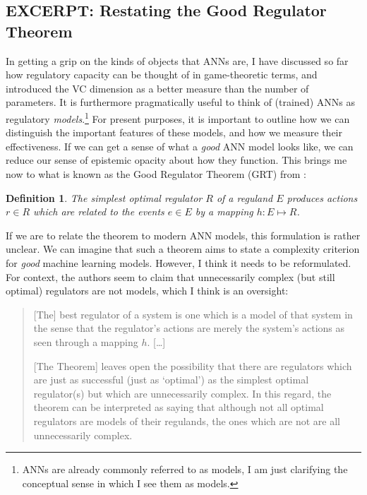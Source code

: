 \documentclass[11pt, oneside]{article}   	%
\newtheorem{theorem}{Definition}
\begin{document}
\subsection{EXCERPT: Restating the Good Regulator Theorem}


In getting a grip on the kinds of objects that ANNs are, I have discussed so far how regulatory capacity can be thought of in game-theoretic terms, and introduced the VC dimension as a better measure than the number of parameters.  It is furthermore pragmatically useful to think of (trained) ANNs as regulatory \emph{models}.\footnote{ANNs are already commonly referred to as models, I am just clarifying the conceptual sense in which I see them as models.}  For present purposes, it is important to outline how we can distinguish the important features of these models, and how we measure their effectiveness. If we can get a sense of what a \emph{good} ANN model looks like, we can reduce our sense of epistemic opacity about how they function.  This brings me now to what is known as the Good Regulator Theorem (GRT) from  \citet{AshbyConant1970}:



\begin{theorem}
\label{GRT}
The simplest optimal regulator $R$ of a reguland $E$ produces actions $r \in R$ which are related to the events $e \in E$ by a mapping $h:E\mapsto R$.
\end{theorem}

If we are to relate the theorem to modern ANN models, this formulation is rather unclear.  We can imagine that such a theorem aims to state a complexity criterion for \emph{good} machine learning models.  However, I think it needs to be reformulated.  For context, the authors seem to claim that unnecessarily complex (but still optimal) regulators are not models, which I think is an oversight:

\begin{quote}
[The] best regulator of a system is one which is a model of that system in the sense that the regulator's actions are merely the system's actions as seen through a mapping $h$.  [\dots] 

[The Theorem] leaves open the possibility that there are regulators which are just as successful (just as `optimal') as the simplest optimal regulator(s) but which are unnecessarily complex.  In this regard, the theorem can be interpreted as saying that although not all optimal regulators are models of their regulands, the ones which are not are all unnecessarily complex.  \cite{AshbyConant1970}
\end{quote}
\end{document}
